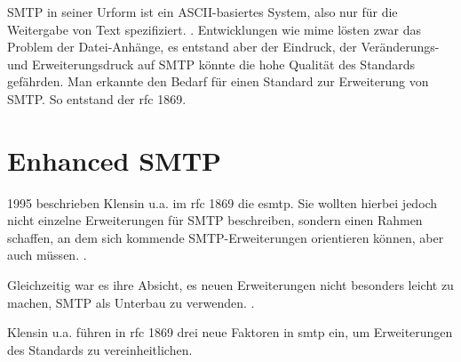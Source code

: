 SMTP in seiner Urform ist ein ASCII-basiertes System, also nur für die Weitergabe von Text spezifiziert.  \citep[][21]{rfc821}. Entwicklungen wie \ac{mime} \citep[vgl.][]{rfc1521} lösten zwar das Problem der Datei-Anhänge, es entstand aber der Eindruck, der Veränderungs- und Erweiterungsdruck auf SMTP könnte die hohe Qualität des Standards gefährden. Man erkannte den Bedarf für einen Standard zur Erweiterung von SMTP. So entstand der \ac{rfc} 1869.

\section{Enhanced SMTP}

1995 beschrieben Klensin u.a. im \ac{rfc} 1869 die \ac{esmtp}.
Sie wollten hierbei jedoch nicht einzelne Erweiterungen für SMTP beschreiben, sondern einen Rahmen schaffen, an dem sich kommende SMTP-Erweiterungen orientieren können, aber auch müssen.  \citep[][1]{rfc1869}. 

Gleichzeitig war es ihre Absicht, es neuen Erweiterungen nicht besonders leicht zu machen, SMTP als Unterbau zu verwenden.  \citep[][2]{rfc1869}. 

Klensin u.a. führen in \ac{rfc} 1869 drei neue Faktoren in \ac{smtp} ein, um Erweiterungen des Standards zu vereinheitlichen.


